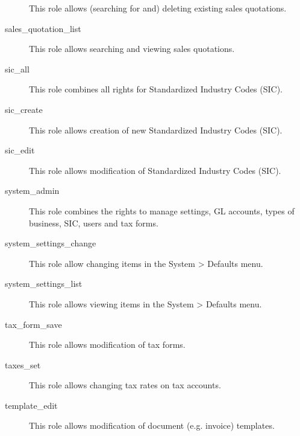 \begin{description}
                         This role allows (searching for and) deleting existing sales quotations.
\item [sales\_quotation\_list] \htmlspacing 
                         This role allows searching and viewing sales quotations.
\item [sic\_all] \htmlspacing 
                         This role combines all rights for Standardized Industry
                         Codes (SIC).
\item [sic\_create] \htmlspacing 
                         This role allows creation of new Standardized Industry
                         Codes (SIC).
\item [sic\_edit] \htmlspacing 
                         This role allows modification of Standardized Industry
                         Codes (SIC).
\item [system\_admin] \htmlspacing 
                         This role combines the rights to manage settings,
                         \gls{GL}  accounts, types of business, SIC, users and tax
                         forms.
\item [system\_settings\_change] \htmlspacing 
                         This role allow changing items in the
                         System \textgreater{} Defaults menu.
\item [system\_settings\_list] \htmlspacing 
                         This role allows viewing items in the System \textgreater{} Defaults
                         menu.
\item [tax\_form\_save] \htmlspacing 
                         This role allows modification of tax forms.
\item [taxes\_set] \htmlspacing 
                         This role allows changing tax rates on tax accounts.
\item [template\_edit] \htmlspacing 
                         This role allows modification of document
                         (e.g. invoice) templates.

\end{description}
